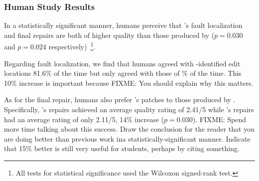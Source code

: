 \subsubsection{Human Study Results}
\label{subsubsec:study_res}

In a statistically significant manner, humans perceive that
\toolname's fault localization and final repairs are both of higher quality
than those produced by \seminal ($p=0.030$ and $p=0.024$ 
respectively)~\footnote{All tests for statistical significance used the 
Wilcoxon signed-rank test.}. 

Regarding fault localization, we find that humans agreed with \toolname-identified 
edit locations 81.6\% of the time but only agreed with those of \% 
of the time. This 10\% increase is important because 
FIXME: You should explain why this matters.  

As for the final repair, humans also prefer \toolname's patches
to those produced by \seminal. Specifically, \toolname's repairs achieved an 
average quality rating of 2.41/5 while \seminal's repairs had an average rating 
of only 2.11/5, 14\% increase ($p=0.030$).
FIXME: Spend more time talking about this success. Draw the conclusion
for the reader that you are doing better than previous work ina
statistically-significant manner. Indicate that 15\% better is still very
useful for students, perhaps by citing something.

